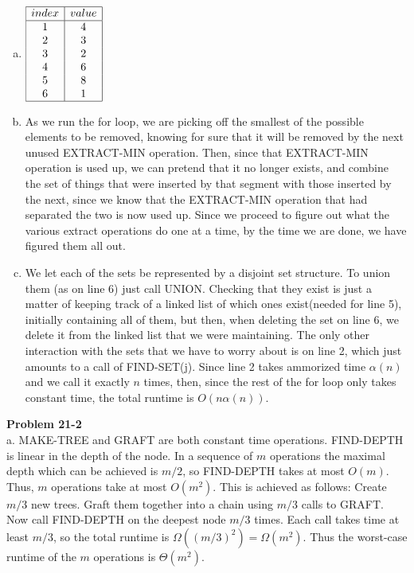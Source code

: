 \documentclass{article}
\begin{document}
\begin{enumerate}[a.]
\item
$
\begin{array}{|c|c|}
\hline
index&value\\
\hline
1&4\\
2&3\\
3&2\\
4&6\\
5&8\\
6&1\\
\hline
\end{array}
$

\item
As we run the for loop, we are picking off the smallest of the possible elements to be removed, knowing for sure that it will be removed by the next unused EXTRACT-MIN operation. Then, since that EXTRACT-MIN operation is used up, we can pretend that it no longer exists, and combine the set of things that were inserted by that segment with those inserted by the next, since we know that the EXTRACT-MIN operation that had separated the two is now used up. Since we proceed to figure out what the various extract operations do one at a time, by the time we are done, we have figured them all out.

\item
We let each of the sets be represented by a disjoint set structure. To union them (as on line 6) just call UNION. Checking that they exist is just a matter of keeping track of a linked list of which ones exist(needed for line 5), initially containing all of them, but then, when deleting the set on line 6, we delete it from the linked list that we were maintaining. The only other interaction with the sets that we have to worry about is on line 2, which just amounts to a call of FIND-SET(j). Since line 2 takes ammorized time $\alpha(n)$ and we call it exactly $n$ times, then, since the rest of the for loop only takes constant time, the total runtime is $O(n\alpha(n))$.

\end{enumerate}

\noindent\textbf{Problem 21-2}\\

a. MAKE-TREE and GRAFT are both constant time operations.  FIND-DEPTH is linear in the depth of the node.  In a sequence of $m$ operations the maximal depth which can be achieved is $m/2$, so FIND-DEPTH takes at most $O(m)$.  Thus, $m$ operations take at most $O(m^2)$.  This is achieved as follows: Create $m/3$ new trees.  Graft them together into a chain using $m/3$ calls to GRAFT.  Now call FIND-DEPTH on the deepest node $m/3$ times.  Each call takes time at least $m/3$, so the total runtime is $\Omega((m/3)^2) = \Omega(m^2)$.  Thus the worst-case runtime of the $m$ operations is $\Theta(m^2)$. \\
\end{document}
